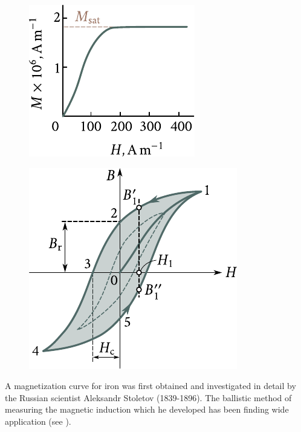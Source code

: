 \begin{figure}[!htb]
	\begin{minipage}[t]{0.48\linewidth}
		\begin{center}
			\includegraphics[scale=1]{figures/ch_07/fig_7_17.pdf}
			\caption[]{}
			\label{fig:7_17}
		\end{center}
	\end{minipage}
	\hfill{ }%
	\begin{minipage}[t]{0.48\linewidth}
		\begin{center}
			\includegraphics[scale=1]{figures/ch_07/fig_7_18.pdf}
			\caption[]{}
			\label{fig:7_18}
		\end{center}
	\end{minipage}
\vspace{-0.4cm}
\end{figure}

A magnetization curve for iron was first obtained and investigated in detail by the Russian scientist Aleksandr Stoletov (1839-1896).
The ballistic method of measuring the magnetic induction which he developed has been finding wide application (see ).

